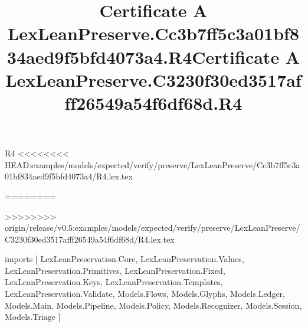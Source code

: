 \begin{lexlean}{R4}
<<<<<<<< HEAD:examples/models/expected/verify/preserve/LexLeanPreserve/Cc3b7ff5c3a01bf834aed9f5bfd4073a4/R4.lex.tex
\title{Certificate A LexLeanPreserve.Cc3b7ff5c3a01bf834aed9f5bfd4073a4.R4}
========
\title{Certificate A LexLeanPreserve.C3230f30ed3517afff26549a54f6df68d.R4}
>>>>>>>> origin/release/v0.5:examples/models/expected/verify/preserve/LexLeanPreserve/C3230f30ed3517afff26549a54f6df68d/R4.lex.tex
\begin{coremodule}
imports [
  LexLeanPreservation.Core,
  LexLeanPreservation.Values,
  LexLeanPreservation.Primitives,
  LexLeanPreservation.Fixed,
  LexLeanPreservation.Keys,
  LexLeanPreservation.Templates,
  LexLeanPreservation.Validate,
  Models.Flows,
  Models.Glyphs,
  Models.Ledger,
  Models.Main,
  Models.Pipeline,
  Models.Policy,
  Models.Recognizer,
  Models.Session,
  Models.Triage
]


\end{coremodule}
\end{lexlean}
